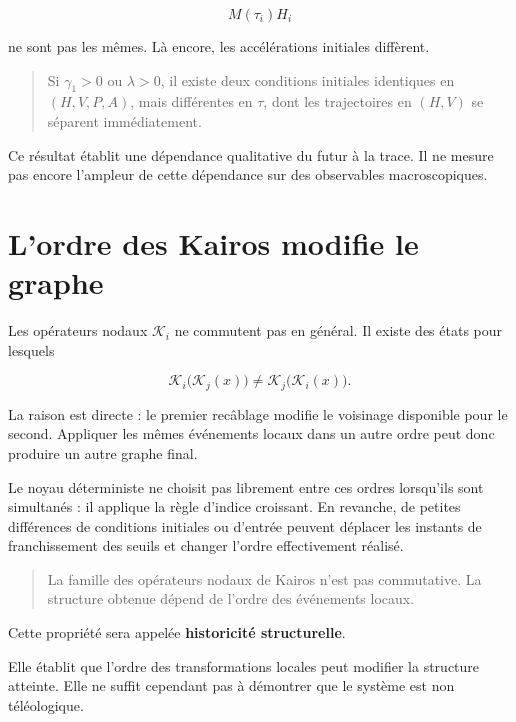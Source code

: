 \[
M(\tau_i)H_i
\]

ne sont pas les mêmes. Là encore, les accélérations initiales diffèrent.

\begin{quote}
 Si \(\gamma_1>0\) ou \(\lambda>0\), il existe deux conditions initiales identiques en \((H,V,P,A)\), mais différentes en \(\tau\), dont les trajectoires en \((H,V)\) se séparent immédiatement.
\end{quote}

Ce résultat établit une dépendance qualitative du futur à la trace. Il ne mesure pas encore l'ampleur de cette dépendance sur des observables macroscopiques.

\section{L'ordre des Kairos modifie le graphe}\label{t1-lordre-des-kairos-modifie-le-graphe}

Les opérateurs nodaux \(\mathcal K_i\) ne commutent pas en général.
Il existe des états pour lesquels

\[
\mathcal K_i\bigl(\mathcal K_j(x)\bigr)
\neq
\mathcal K_j\bigl(\mathcal K_i(x)\bigr).
\]

La raison est directe : le premier recâblage modifie le voisinage disponible pour le second. Appliquer les mêmes événements locaux dans un autre ordre peut donc produire un autre graphe final.

Le noyau déterministe ne choisit pas librement entre ces ordres lorsqu'ils sont simultanés : il applique la règle d'indice croissant. En revanche, de petites différences de conditions initiales ou d'entrée peuvent déplacer les instants de franchissement des seuils et changer l'ordre effectivement réalisé.

\begin{quote}
 La famille des opérateurs nodaux de Kairos n'est pas commutative. La structure obtenue dépend de l'ordre des événements locaux.
\end{quote}

Cette propriété sera appelée \textbf{historicité structurelle}.

Elle établit que l'ordre des transformations locales peut modifier la structure atteinte. Elle ne suffit cependant pas à démontrer que le système est non téléologique.

